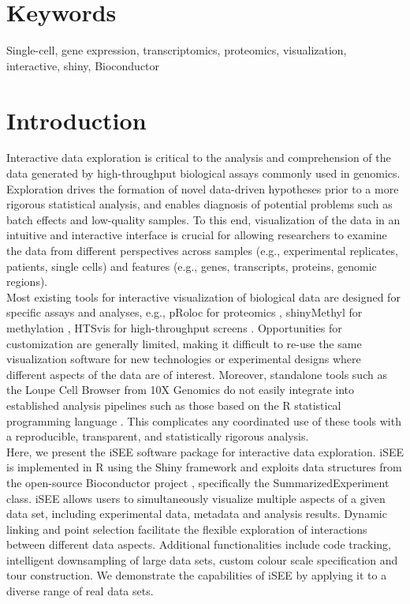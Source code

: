 \documentclass[10pt,a4paper,twocolumn]{article}
\begin{document}
\section*{Keywords}


Single-cell, gene expression, transcriptomics, proteomics, visualization, interactive, shiny, Bioconductor


\clearpage

\section*{Introduction}
Interactive data exploration is critical to the analysis and comprehension of the data generated by high-throughput biological assays commonly used in genomics.
Exploration drives the formation of novel data-driven hypotheses prior to a more rigorous statistical analysis, and enables diagnosis of potential problems such as batch effects and low-quality samples.
To this end, visualization of the data in an intuitive and interactive interface is crucial for allowing researchers to examine the data from different perspectives across samples (e.g., experimental replicates, patients, single cells) and features (e.g., genes, transcripts, proteins, genomic regions).\\

Most existing tools for interactive visualization of biological data are designed for specific assays and analyses, e.g., pRoloc for proteomics \citep{gatto2014mass}, shinyMethyl for methylation \citep{fortin2014shinymethyl}, HTSvis for high-throughput screens \citep{scheeder2017htsvis}.
Opportunities for customization are generally limited, making it difficult to re-use the same visualization software for new technologies or experimental designs where different aspects of the data are of interest.
Moreover, standalone tools such as the Loupe Cell Browser from 10X Genomics \citep{zheng2017massively} do not easily integrate into established analysis pipelines such as those based on the R statistical programming language \citep{rcore2008R}.
This complicates any coordinated use of these tools with a reproducible, transparent, and statistically rigorous analysis.\\

Here, we present the iSEE software package for interactive data exploration.
iSEE is implemented in R using the Shiny framework \citep{chang2017shiny} and exploits data structures from the open-source Bioconductor project \citep{gentleman2004bioconductor}, specifically the SummarizedExperiment class.
iSEE allows users to simultaneously visualize multiple aspects of a given data set, including experimental data, metadata and analysis results.
Dynamic linking and point selection facilitate the flexible exploration of interactions between different data aspects.
Additional functionalities include code tracking, intelligent downsampling of large data sets, custom colour scale specification and tour construction.
We demonstrate the capabilities of iSEE by applying it to a diverse range of real data sets.
\end{document}
